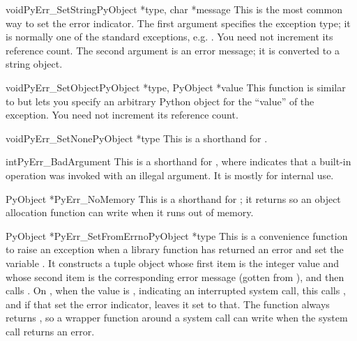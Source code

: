 \documentclass[twoside,openright]{report}
\begin{document}
\begin{cfuncdesc}{void}{PyErr_SetString}{PyObject *type, char *message}
This is the most common way to set the error indicator.  The first
argument specifies the exception type; it is normally one of the
standard exceptions, e.g. .  You need not
increment its reference count.  The second argument is an error
message; it is converted to a string object.
\end{cfuncdesc}

\begin{cfuncdesc}{void}{PyErr_SetObject}{PyObject *type, PyObject *value}
This function is similar to  but lets you
specify an arbitrary Python object for the ``value'' of the exception.
You need not increment its reference count.
\end{cfuncdesc}

\begin{cfuncdesc}{void}{PyErr_SetNone}{PyObject *type}
This is a shorthand for .
\end{cfuncdesc}

\begin{cfuncdesc}{int}{PyErr_BadArgument}{}
This is a shorthand for , where  indicates that a built-in operation
was invoked with an illegal argument.  It is mostly for internal use.
\end{cfuncdesc}

\begin{cfuncdesc}{PyObject *}{PyErr_NoMemory}{}
This is a shorthand for ; it
returns \NULL{} so an object allocation function can write
 when  it runs out of memory.
\end{cfuncdesc}

\begin{cfuncdesc}{PyObject *}{PyErr_SetFromErrno}{PyObject *type}
This is a convenience function to raise an exception when a \C{} library
function has returned an error and set the \C{} variable .
It constructs a tuple object whose first item is the integer
 value and whose second item is the corresponding error
message (gotten from ), and then calls
.  On \UNIX{}, when
the  value is , indicating an interrupted
system call, this calls , and if that set
the error indicator, leaves it set to that.  The function always
returns \NULL{}, so a wrapper function around a system call can write 
 when  the system call returns an error.
\end{cfuncdesc}
\end{document}
